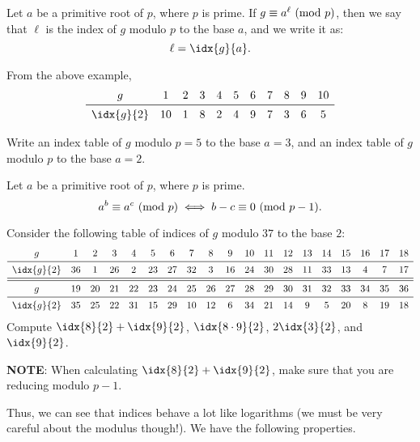 \begin{Definition}{}{}
    Let $ a $ be a primitive root of $ p $, where $ p $ is prime. If $ g\equiv a^{\ell}\ (\mathrm{mod}\ p) $,
    then we say that $ \ell $ is the index of $ g $ modulo $ p $ to the base $ a $, and we write it as:
    \[ \ell=\idx{g}{a}. \]
\end{Definition}
From the above example,
\[ \begin{array}{ccccccccccc}
        g          & 1  & 2 & 3 & 4 & 5 & 6 & 7 & 8 & 9 & 10 \\
        \midrule
        \idx{g}{2} & 10 & 1 & 8 & 2 & 4 & 9 & 7 & 3 & 6 & 5  \\
    \end{array} \]
\begin{Exercise}{}{}
    Write an index table of $ g $ modulo $ p=5 $ to the base $ a=3 $, and an index table of $ g $ modulo $ p $ to the base $ a=2 $.
\end{Exercise}
\begin{Lemma}{}{}
    Let $ a $ be a primitive root of $ p $, where $ p $ is prime.
    \[ a^b\equiv a^c\ (\mathrm{mod}\ p)\iff b-c\equiv 0\ (\mathrm{mod}\ p-1). \]
\end{Lemma}
\begin{Exercise}{}{}
    Consider the following table of indices of $ g $ modulo $ 37 $ to the base $ 2 $:
    \[ \begin{array}{ccccccccccccccccccc}
            g          & 1  & 2  & 3  & 4  & 5  & 6  & 7  & 8  & 9  & 10 & 11 & 12 & 13 & 14 & 15 & 16 & 17 & 18 \\
            \midrule
            \idx{g}{2} & 36 & 1  & 26 & 2  & 23 & 27 & 32 & 3  & 16 & 24 & 30 & 28 & 11 & 33 & 13 & 4  & 7  & 17 \\
            \midrule\midrule
            g          & 19 & 20 & 21 & 22 & 23 & 24 & 25 & 26 & 27 & 28 & 29 & 30 & 31 & 32 & 33 & 34 & 35 & 36 \\
            \midrule
            \idx{g}{2} & 35 & 25 & 22 & 31 & 15 & 29 & 10 & 12 & 6  & 34 & 21 & 14 & 9  & 5  & 20 & 8  & 19 & 18 \\
        \end{array} \]
    Compute $ \idx{8}{2}+\idx{9}{2} $, $ \idx{8\cdot 9}{2} $, $ 2\idx{3}{2} $, and $ \idx{9}{2} $.
\end{Exercise}

\textbf{NOTE}: When calculating $ \idx{8}{2}+\idx{9}{2} $, make sure that you are reducing modulo $ p-1 $.

Thus, we can see that indices behave a lot like logarithms (we must be very
careful about the modulus though!). We have the following properties.

